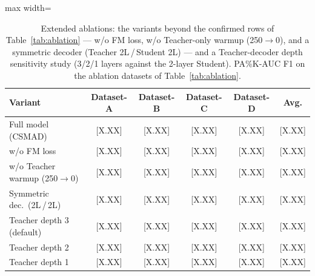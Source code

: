 \begin{table}[tp]
\footnotesize
\centering
\caption{Extended ablations: the variants beyond the confirmed rows of
  Table~\ref{tab:ablation} --- w/o FM loss, w/o Teacher-only warmup (250$\to$0), and a
  symmetric decoder (Teacher 2L\,/\,Student 2L) --- and a Teacher-decoder depth sensitivity
  study (3/2/1 layers against the 2-layer Student). PA\%K-AUC F1 on the ablation datasets of
  Table~\ref{tab:ablation}.}
\label{tab:extended_ablations}
\begin{adjustbox}{max width=\linewidth}
\begin{tabular}{lccccc}
\toprule
Variant & Dataset-A & Dataset-B & Dataset-C & Dataset-D & Avg. \\
\midrule
Full model (CSMAD)         & {[X.XX]} & {[X.XX]} & {[X.XX]} & {[X.XX]} & {[X.XX]} \\
w/o FM loss                & {[X.XX]} & {[X.XX]} & {[X.XX]} & {[X.XX]} & {[X.XX]} \\
w/o Teacher warmup (250$\to$0) & {[X.XX]} & {[X.XX]} & {[X.XX]} & {[X.XX]} & {[X.XX]} \\
Symmetric dec.\ (2L\,/\,2L) & {[X.XX]} & {[X.XX]} & {[X.XX]} & {[X.XX]} & {[X.XX]} \\
\midrule
Teacher depth 3 (default)  & {[X.XX]} & {[X.XX]} & {[X.XX]} & {[X.XX]} & {[X.XX]} \\
Teacher depth 2            & {[X.XX]} & {[X.XX]} & {[X.XX]} & {[X.XX]} & {[X.XX]} \\
Teacher depth 1            & {[X.XX]} & {[X.XX]} & {[X.XX]} & {[X.XX]} & {[X.XX]} \\
\bottomrule
\end{tabular}
\end{adjustbox}
\end{table}
